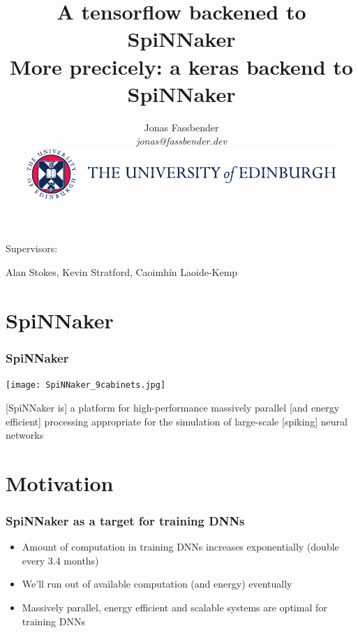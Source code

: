 \documentclass[xcolor=x11names,compress,usenames,dvipsnames,mathsans]{beamer}
\title[GitLab demo]{A tensorflow backened to SpiNNaker \\
  More precicely: a keras backend to SpiNNaker}
\author[author]{Jonas Fassbender \\
\textit{jonas@fassbender.dev} \\
\vspace{1em}
\includegraphics[scale=.8]{logo_colour.pdf}
} %
\date{}
\begin{document}
\begin{frame}
  \titlepage
  \vspace{-2cm}

  \begin{center}
  Supervisors:

  Alan Stokes, Kevin Stratford, Caoimhín Laoide-Kemp
  \end{center}
\end{frame}

\section{SpiNNaker}

\begin{frame}[fragile]
  \frametitle{SpiNNaker}

  \begin{center}
    \texttt{[image: SpiNNaker\_9cabinets.jpg]}
  \end{center}

  [SpiNNaker is] a platform for high-performance massively
  parallel [and energy efficient] processing appropriate
  for the simulation of large-scale [spiking] neural
  networks \cite{spinnaker_project}

\end{frame}

\section{Motivation}

\begin{frame}[fragile]
  \frametitle{SpiNNaker as a target for training DNNs}

  \begin{itemize}[<+->]
    \item Amount of computation in training DNNs
          increases exponentially (double every 3.4 months)
          \cite{openai2019}
    \item We'll run out of available computation (and
          energy) eventually
    \item Massively parallel, energy efficient and scalable
          systems are optimal for training DNNs
  \end{itemize}
\end{frame}

\end{document}
